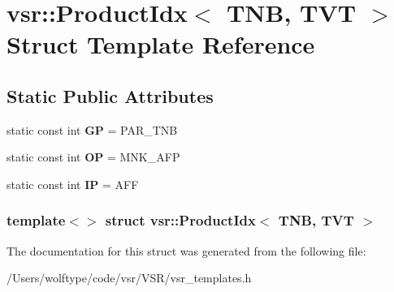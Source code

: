 \hypertarget{structvsr_1_1_product_idx_3_01_t_n_b_00_01_t_v_t_01_4}{\section{vsr\-:\-:Product\-Idx$<$ T\-N\-B, T\-V\-T $>$ Struct Template Reference}
\label{structvsr_1_1_product_idx_3_01_t_n_b_00_01_t_v_t_01_4}
}
\subsection*{Static Public Attributes}
\begin{DoxyCompactItemize}
\item 
\hypertarget{structvsr_1_1_product_idx_3_01_t_n_b_00_01_t_v_t_01_4_ad9e3ce635f89bca2827211488e69671b}{static const int {\bfseries G\-P} = P\-A\-R\-\_\-\-T\-N\-B}\label{structvsr_1_1_product_idx_3_01_t_n_b_00_01_t_v_t_01_4_ad9e3ce635f89bca2827211488e69671b}

\item 
\hypertarget{structvsr_1_1_product_idx_3_01_t_n_b_00_01_t_v_t_01_4_ac85f24845d5226ed84519d4048169b13}{static const int {\bfseries O\-P} = M\-N\-K\-\_\-\-A\-F\-P}\label{structvsr_1_1_product_idx_3_01_t_n_b_00_01_t_v_t_01_4_ac85f24845d5226ed84519d4048169b13}

\item 
\hypertarget{structvsr_1_1_product_idx_3_01_t_n_b_00_01_t_v_t_01_4_aaf7188766ee83b8d263e412882bf5571}{static const int {\bfseries I\-P} = A\-F\-F}\label{structvsr_1_1_product_idx_3_01_t_n_b_00_01_t_v_t_01_4_aaf7188766ee83b8d263e412882bf5571}

\end{DoxyCompactItemize}
\subsubsection*{template$<$$>$ struct vsr\-::\-Product\-Idx$<$ T\-N\-B, T\-V\-T $>$}



The documentation for this struct was generated from the following file\-:\begin{DoxyCompactItemize}
\item 
/\-Users/wolftype/code/vsr/\-V\-S\-R/vsr\-\_\-templates.\-h\end{DoxyCompactItemize}
